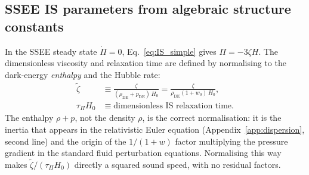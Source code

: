 \documentclass[12pt,a4paper]{article}
\newcommand{\wz}{w_0}
\newcommand{\tauPi}{\tau_\Pi}
\newcommand{\ztilde}{\tilde{\zeta}}
\begin{document}
\subsection{SSEE IS parameters from algebraic structure constants}
\label{subsec:IS_params}

In the SSEE steady state $\dot{\Pi}=0$, Eq.~\eqref{eq:IS_simple} gives
$\Pi = -3\zeta H$.
The dimensionless viscosity and relaxation time are defined by normalising to
the dark-energy \emph{enthalpy} and the Hubble rate:
\begin{align}
  \ztilde &\equiv \frac{\zeta}{(\rho_{\mathrm{DE}}+p_{\mathrm{DE}})\,H_0}
           = \frac{\zeta}{\rho_{\mathrm{DE}}(1+\wz)\,H_0}, \\
  \tauPi H_0 &\equiv \text{dimensionless IS relaxation time}.
\end{align}
The enthalpy $\rho+p$, not the density $\rho$, is the correct normalisation:
it is the inertia that appears in the relativistic Euler equation
(Appendix~\ref{app:dispersion}, second line) and the origin of the $1/(1+w)$
factor multiplying the pressure gradient in the standard fluid perturbation
equations. Normalising this way makes $\ztilde/(\tauPi H_0)$ directly a squared
sound speed, with no residual factors.
\end{document}
